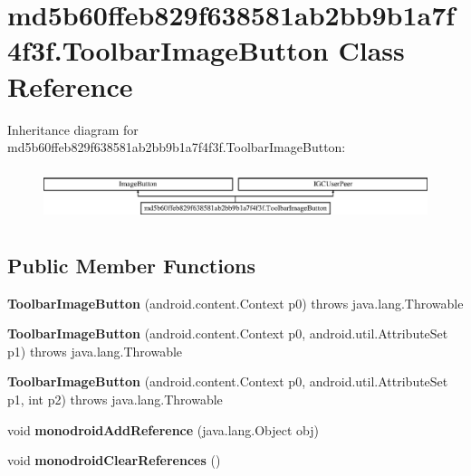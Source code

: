 \hypertarget{classmd5b60ffeb829f638581ab2bb9b1a7f4f3f_1_1ToolbarImageButton}{}\section{md5b60ffeb829f638581ab2bb9b1a7f4f3f.\+Toolbar\+Image\+Button Class Reference}
\label{classmd5b60ffeb829f638581ab2bb9b1a7f4f3f_1_1ToolbarImageButton}
Inheritance diagram for md5b60ffeb829f638581ab2bb9b1a7f4f3f.\+Toolbar\+Image\+Button\+:\begin{figure}[H]
\begin{center}
\leavevmode
\includegraphics[height=1.538461cm]{classmd5b60ffeb829f638581ab2bb9b1a7f4f3f_1_1ToolbarImageButton}
\end{center}
\end{figure}
\subsection*{Public Member Functions}
\begin{DoxyCompactItemize}
\item 
\mbox{\label{classmd5b60ffeb829f638581ab2bb9b1a7f4f3f_1_1ToolbarImageButton_a5b82e6fb711d83ddca88b91ff6a3fac3}} 
{\bfseries Toolbar\+Image\+Button} (android.\+content.\+Context p0)  throws java.\+lang.\+Throwable 	
\item 
\mbox{\label{classmd5b60ffeb829f638581ab2bb9b1a7f4f3f_1_1ToolbarImageButton_ae32a9e49a9fa0aa0435c1f35ef1f08a5}} 
{\bfseries Toolbar\+Image\+Button} (android.\+content.\+Context p0, android.\+util.\+Attribute\+Set p1)  throws java.\+lang.\+Throwable 	
\item 
\mbox{\label{classmd5b60ffeb829f638581ab2bb9b1a7f4f3f_1_1ToolbarImageButton_aea3b6b5b763a9df42845f08ae1587edc}} 
{\bfseries Toolbar\+Image\+Button} (android.\+content.\+Context p0, android.\+util.\+Attribute\+Set p1, int p2)  throws java.\+lang.\+Throwable 	
\item 
\mbox{\label{classmd5b60ffeb829f638581ab2bb9b1a7f4f3f_1_1ToolbarImageButton_a11accc7abc6a78cc08dc6f299d74ad94}} 
void {\bfseries monodroid\+Add\+Reference} (java.\+lang.\+Object obj)
\item 
\mbox{\label{classmd5b60ffeb829f638581ab2bb9b1a7f4f3f_1_1ToolbarImageButton_a584b37224644170816eb54f59c59945c}} 
void {\bfseries monodroid\+Clear\+References} ()
\end{DoxyCompactItemize}
